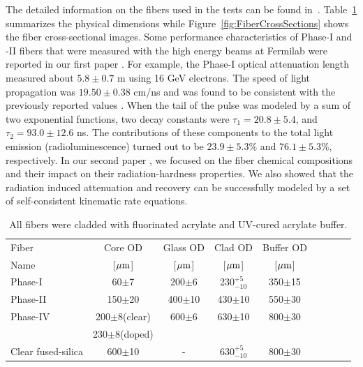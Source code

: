\documentclass[a4paper,11pt]{article}
\begin{document}
The detailed information on the fibers used in the tests can be found in~\cite{JINSTPaper}.  Table~\ref{tab:fiberlist} summarizes the physical dimensions while Figure~\ref{fig:FiberCrossSections} shows the fiber cross-sectional images.  Some performance characteristics of Phase-I and -II fibers that were measured with the high energy beams at Fermilab were reported in our first paper \cite{JINSTPaper}.  For example, the Phase-I optical attenuation length measured about $5.8\pm0.7$ m using 16 GeV  electrons.  The speed of light propagation was $19.50\pm0.38$ cm/ns and was found to be consistent with the previously reported values \cite{Goro,Akch97}.  When the tail of the pulse was modeled by a sum of two exponential functions, two decay constants were $\tau_1= 20.8\pm5.4$, and $\tau_2= 93.0\pm12.6$ ns.  The contributions of these components to the total light emission (radioluminescence) turned out to be $23.9\pm5.3$\% and $76.1\pm5.3$\%, respectively.  In our second paper \cite{JINSTPaper}, we focused on the fiber chemical compositions and their impact on their radiation-hardness properties.  We also showed that the radiation induced attenuation and recovery can be successfully modeled by a set of self-consistent kinematic rate equations.

\begin{table}[htp]
\caption{\small All fibers were cladded with fluorinated acrylate and UV-cured acrylate buffer.}
\vspace{-2 mm}
\begin{center}
{\small
\begin{tabular}{|l|c|c|c|c|c|c|c|c|} \hline
Fiber              &  Core OD            & Glass OD        & Clad OD          & Buffer  OD        \\
Name               &[${\rm \mu m}$]      & [${\rm \mu m}$] & [${\rm \mu m}$]  & [${\rm \mu m}$]   \\
\hline
Phase-I            & 60$\pm$7            &	200$\pm$6      & 230$^{+5}_{-10}$ &	350$\pm$15        \\
Phase-II           & 150$\pm$20		     &	400$\pm$10     & 430$\pm$10	      &	550$\pm$30        \\
Phase-IV           & 200$\pm$8(clear)   &	600$\pm$6	   & 630$\pm$10       &	800$\pm$30        \\
                          & 230$\pm$8(doped) &	   &     &	         \\
Clear fused-silica & 600$\pm$10          &-				   & 630$^{+5}_{-10}$ &	800$\pm$30	      \\
\hline
\end{tabular}
}
\end{center}
\label{tab:fiberlist}
\end{table}
\end{document}
